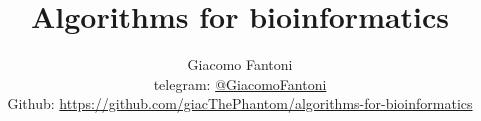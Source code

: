 

\title{\Huge\textbf{{Algorithms for bioinformatics}}}

\author{
  Giacomo Fantoni \\
  \small telegram: \href{https://t.me/GiacomoFantoni}{@GiacomoFantoni} \\[3pt]
\small Github: \href{https://github.com/giacThePhantom/algorithms-for-bioinformatics}{https://github.com/giacThePhantom/algorithms-for-bioinformatics}
}


\maketitle
\tableofcontents











